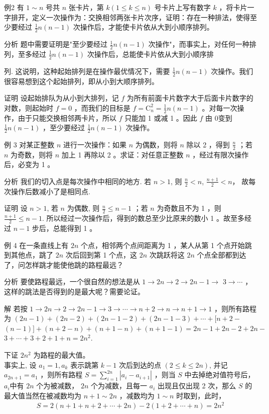 \documentclass[10pt]{article}
\begin{document}
例2 有 $1 \sim n$ 号共 $n$ 张卡片，第 $k(1 \leqslant k \leqslant n)$ 号卡片上写有数字 $k$ ，将卡片一字排开，定义一次操作为：交换相邻两张卡片次序，证明：存在一种排法，使得至少要经过 $\frac{1}{2} n(n-1)$ 次操作后，才能使卡片依从大到小顺序排列。

分析 题中需要证明是"至少要经过 $\frac{1}{2} n(n-1)$ 次操作"，而事实上，对任何一种排列，至多经过 $\frac{1}{2} n(n-1)$ 次操作后，总能使卡片依从大到小顺序排

列. 这说明，这种起始排列是在操作最优情况下，需要 $\frac{1}{2} n(n-1)$ 次操作。我们很容易想到这个起始排列，即从小到大顺序排列。

证明 设起始排队为从小到大排列，记 $f$ 为所有前面卡片数字大于后面卡片数字的对数，则起始时 $f=0$ ，而我们的目标是 $f=\mathrm{C}_{n}^{2}=\frac{1}{2} n(n-1)$ 。对每一次操作，由于只能交换相邻两卡片，所以 $f$ 只能加 1 或减 1 。因此 $f$ 由 0变到 $\frac{1}{2} n(n-1)$ ，至少要经过 $\frac{1}{2} n(n-1)$ 次操作。

例 3 对某正整数 $n$ 进行一次操作：如果 $n$ 为偶数，则将 $n$ 除以 2 ，得到 $\frac{n}{2}$ ；若 $n$ 为奇数，则将 $n$ 加上 1 再除以 2 。求证：对任意正整数 $n$ ，经过有限次操作后，必变为 1 。

分析 我们的切入点是每次操作中相同的地方. 若 $n>1$, 则 $\frac{n}{2}<n$, $\frac{n+1}{2}<n ，$ 故每次操作后数减小了是相同点.

证明 设 $n>1$, 若 $n$ 为偶数, 则 $\frac{n}{2} \leqslant n-1$ ；若 $n$ 为奇数且不为 1 ，则 $\frac{n+1}{2} \leqslant n-1$. 所以经过一次操作后，得到的数总至少比原来的数小 1 。故至多经过 $n-1$ 步后，总能得到 1 。

例 4 在一条直线上有 $2 n$ 个点，相邻两个点间距离为 1 ，某人从第 1 个点开始跳到其他点，跳了 $2 n$ 次后回到第 1 个点，这 $2 n$ 次跳跃将这 $2 n$ 个点全部都到达了，问怎样跳才能使他跳的路程最远？

分析 要使路程最远，一个很自然的想法是从 $1 \rightarrow 2 n \rightarrow 2 \rightarrow 2 n-1 \rightarrow$ $3 \rightarrow \cdots$ ，这样的跳法是否得到的是最大呢？需要论证。

解 若按 $1 \rightarrow 2 n \rightarrow 2 \rightarrow 2 n-1 \rightarrow 3 \rightarrow \cdots \rightarrow n+2 \rightarrow n \rightarrow n+1 \rightarrow 1$ ，则所有路程为 $(2 n-1)+(2 n-2)+(2 n-1-2)+(2 n-1-3)+\cdots+[n+2-$ $(n-1)]+(n+2-n)+(n+1-n)+(n+1-1)=2 n-1+2 n-2+2 n-$ $3+\cdots+3+2+1+n=2 n^{2}$.

下证 $2 n^{2}$ 为路程的最大值。\\
事实上, 设 $a_{1}=1, a_{k}$ 表示跳第 $k-1$ 次后到达的点 $(2 \leqslant k \leqslant 2 n)$, 并记 $a_{2 n+1}=a_{1}$ ，则所有路程 $S=\sum_{i=1}^{2 n}\left|a_{i}-a_{i+1}\right|$ ，则当 $S$ 中去掉绝对值符号后， $a_{i}$中有 $2 n$ 个为被减数， $2 n$ 个为减数，且每一 $a_{i}$ 出现且仅出现 2 次，那么 $S$ 的最大值当然在被减数均为 $n+1 \sim 2 n$ ，减数均为 $1 \sim n$ 时取到，此时，\\
\begin{align*}
S=2(n+1+n+2+\cdots+2 n)-2(1+2+\cdots+n)=2 n^{2}
\end{align*}
\end{document}
